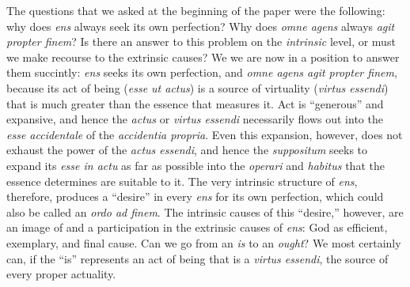 The questions that we asked at the beginning of the paper were the following: why does \emph{ens} always seek its own perfection? Why does \emph{omne agens} always \emph{agit propter finem}? Is there an answer to this problem on the \emph{intrinsic} level, or must we make recourse to the extrinsic causes? We we are now in a position to answer them succintly: \emph{ens} seeks its own perfection, and \emph{omne agens agit propter finem}, because its act of being (\emph{esse ut actus}) is a source of virtuality (\emph{virtus essendi}) that is much greater than the essence that measures it. Act is ``generous'' and expansive, and hence the \emph{actus} or \emph{virtus essendi} necessarily flows out into the \emph{esse accidentale} of the \emph{accidentia propria}. Even this expansion, however, does not exhaust the power of the \emph{actus essendi}, and hence the \emph{suppositum} seeks to expand its \emph{esse in actu} as far as possible into the \emph{operari} and \emph{habitus} that the essence determines are suitable to it. The very intrinsic structure of \emph{ens}, therefore, produces a ``desire'' in every \emph{ens} for its own perfection, which could also be called an \emph{ordo ad finem}. The intrinsic causes of this ``desire,'' however, are an image of and a participation in the extrinsic causes of \emph{ens}: God as efficient, exemplary, and final cause. Can we go from an \emph{is} to an \emph{ought}? We most certainly can, if the ``is'' represents an act of being that is a \emph{virtus essendi}, the source of every proper actuality.

